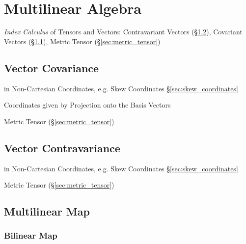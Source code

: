 \section{Multilinear Algebra}\label{sec:multilinear_algebra}

\emph{Index Calculus} of Tensors and Vectors: Contravariant Vectors
(\S\ref{sec:vector_contravariance}), Covariant Vectors
(\S\ref{sec:vector_covariance}), Metric Tensor (\S\ref{sec:metric_tensor})



\subsection{Vector Covariance}\label{sec:vector_covariance}

in Non-Cartesian Coordinates, e.g. Skew Coordinates \S\ref{sec:skew_coordinates}

Coordinates given by Projection onto the Basis Vectors

Metric Tensor (\S\ref{sec:metric_tensor})



\subsection{Vector Contravariance}\label{sec:vector_contravariance}

in Non-Cartesian Coordinates, e.g. Skew Coordinates \S\ref{sec:skew_coordinates}

Metric Tensor (\S\ref{sec:metric_tensor})



\subsection{Multilinear Map}\label{sec:multilinear_map}

\subsubsection{Bilinear Map}\label{sec:bilinear_map}

